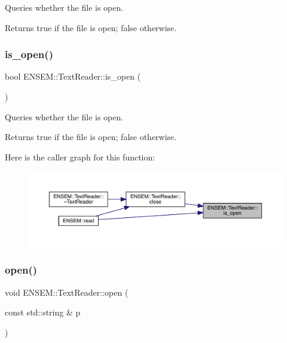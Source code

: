 Queries whether the file is open. 

\begin{DoxyReturn}{Returns}
true if the file is open; false otherwise. 
\end{DoxyReturn}
\mbox{\label{classENSEM_1_1TextReader_a67e8ac68ff413c1101522eedafc2d994}} 
\subsubsection{\texorpdfstring{is\_open()}{is\_open()}\hspace{0.1cm}{\footnotesize\ttfamily [2/2]}}
{\footnotesize\ttfamily bool E\+N\+S\+E\+M\+::\+Text\+Reader\+::is\+\_\+open (\begin{DoxyParamCaption}{ }\end{DoxyParamCaption})}



Queries whether the file is open. 

\begin{DoxyReturn}{Returns}
true if the file is open; false otherwise. 
\end{DoxyReturn}
Here is the caller graph for this function\+:\nopagebreak
\begin{figure}[H]
\begin{center}
\leavevmode
\includegraphics[width=350pt]{d4/d23/classENSEM_1_1TextReader_a67e8ac68ff413c1101522eedafc2d994_icgraph}
\end{center}
\end{figure}
\mbox{\label{classENSEM_1_1TextReader_a167e412dc7a3a56fae35ccb4cc9d9029}} 
\subsubsection{\texorpdfstring{open()}{open()}\hspace{0.1cm}{\footnotesize\ttfamily [1/2]}}
{\footnotesize\ttfamily void E\+N\+S\+E\+M\+::\+Text\+Reader\+::open (\begin{DoxyParamCaption}\item[{const std\+::string \&}]{p }\end{DoxyParamCaption})}



